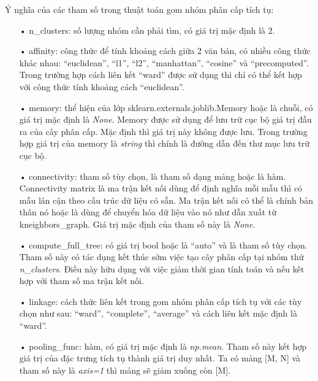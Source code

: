 Ý nghĩa của các tham số trong thuật toán gom nhóm phân cấp tích tụ:
\begin{enumerate}
\item[•]n{\_}clusters: số lượng nhóm cần phải tìm, có giá trị mặc định là 2.
\item[•]affinity: công thức để tính khoảng cách giữa 2 văn bản, có nhiều công thức khác nhau: ``euclidean'', ``l1'', ``l2'', ``manhattan'', ``cosine'' và ``precomputed''.
Trong trường hợp cách liên kết ``ward'' được sử dụng thì chỉ có thể kết hợp với công thức tính khoảng cách ``euclidean''.
\item[•]memory: thể hiện của lớp sklearn.externals.joblib.Memory hoặc là chuỗi, có giá trị mặc định là \textit{None}.
Memory được sử dụng để lưu trữ cục bộ giá trị đầu ra của cây phân cấp.
Mặc định thì giá trị này không được lưu.
Trong trường hợp giá trị của memory là \textit{string} thì chính là đường dẫn đến thư mục lưu trữ cục bộ.
\item[•]connectivity: tham số tùy chọn, là tham số dạng mảng hoặc là hàm.
Connectivity matrix là ma trận kết nối dùng để định nghĩa mỗi mẫu thì có mẫu lân cận theo cấu trúc dữ liệu có sẵn.
Ma trận kết nối có thể là chính bản thân nó hoặc là dùng để chuyển hóa dữ liệu vào nó như dẫn xuất từ kneighbors{\_}graph.
Giá trị mặc định của tham số này là \textit{None}.
\item[•]compute{\_}full{\_}tree: có giá trị bool hoặc là ``auto'' và là tham số tùy chọn.
Tham số này có tác dụng kết thúc sớm việc tạo cây phân cấp tại nhóm thứ \textit{n{\_}clusters}.
Điều này hữu dụng với việc giảm thời gian tính toán và nếu kết hợp với tham số ma trận kết nối.
\item[•]linkage: cách thức liên kết trong gom nhóm phân cấp tích tụ với các tùy chọn như sau: {``ward'', ``complete'', ``average''} và cách liên kết mặc định là ``ward''.
\item[•]pooling{\_}func: hàm, có giá trị mặc định là \textit{np.mean}.
Tham số này kết hợp giá trị của đặc trưng tích tụ thành giá trị duy nhất.
Ta có mảng [M, N] và tham số này là \textit{axis=1} thì mảng sẽ giảm xuống còn [M].
\end{enumerate}

